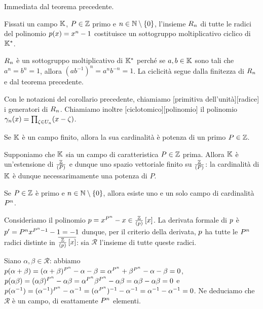 \Proof
Immediata dal teorema precedente.
\EndProof
\begin{Corollary}
	Fissati un campo $\mathbb{K}$, $P \in \mathbb{Z}$ primo e
	$n \in \mathbb{N} \setminus \lbrace 0 \rbrace$,
	l'insieme $\Roots_n$ di tutte le radici del polinomio
	$p(x) = x^n - 1$ costituisce un sottogruppo
	moltiplicativo ciclico di $\mathbb{K}^*$.
\end{Corollary}
\Proof
$\Roots_n$ \`e un sottogruppo moltiplicativo di $\mathbb{K}^*$
perch\'e se $a, b \in \mathbb{K}$ sono tali che $a^n = b^n = 1$, allora
$(ab^{-1})^n = a^nb^{-n} = 1$. La ciclicit\`a segue dalla finitezza di
$\Roots_n$ e dal teorema precedente.
\EndProof
\begin{Definition}\label{radici_primitive_def}
	Con le notazioni del corollario precedente,
	chiamiamo
	[primitiva dell'unit\`a][radice]
	i generatori di $\Roots_n$.
	Chiamiamo inoltre
	[ciclotomico][polinomio]
	il polinomio
	$\CyclotomicPolynomial{n}(x) =
	\prod_{\PrimitiveRoot \in \PrimitiveRoots[n]}
	(x - \PrimitiveRoot)$.
\end{Definition}
\begin{Theorem}
	Se $\mathbb{K}$ \`e un campo finito,
	allora la sua cardinalit\`a \`e potenza di un primo
	$P \in \mathbb{Z}$.
\end{Theorem}
\Proof
Supponiamo che $\mathbb{K}$ sia un campo di caratteristica
$P \in \mathbb{Z}$ prima.
Allora $\mathbb{K}$ \`e un'estensione di
$\frac{\mathbb{Z}}{\left ( P \right )}$ e dunque uno spazio vettoriale
finito su $\frac{\mathbb{Z}}{\left ( P \right )}$: la cardinalit\`a di
$\mathbb{K}$ \`e dunque necessarimamente una potenza di $P$.
\EndProof
\begin{Theorem}
	Se $P \in \mathbb{Z}$ \`e primo e $n \in \mathbb{N} \setminus \lbrace 0 \rbrace$, allora esiste uno e un solo campo di cardinalit\`a $P^n$.
\end{Theorem}
\Proof Consideriamo il polinomio $p = x^{P^n} - x \in \frac{\mathbb{Z}}{\left ( p \right )} \left [ x \right ]$. La derivata formale di $p$ \`e $p' = P^nx^{P^n - 1} - 1 = -1$ dunque, per il criterio della derivata, $p$ ha tutte le $P^n$ radici distinte in $\overline{\frac{\mathbb{Z}}{\left ( p \right )} \left [ x \right ]}$: sia $\mathcal{R}$ l'insieme di tutte queste radici.
\par Siano $\alpha, \beta \in \mathcal{R}$: abbiamo $p(\alpha + \beta) = (\alpha + \beta)^{P^n} - \alpha - \beta = \alpha^{P^n} + \beta^{P^n} - \alpha - \beta = 0$, $p(\alpha\beta) = (\alpha\beta)^{P^n} - \alpha\beta = \alpha^{P^n}\beta^{P^n} - \alpha\beta = \alpha\beta - \alpha\beta = 0$ e $p(\alpha^{-1}) = (\alpha^{-1})^{P^n} - \alpha^{-1} = (\alpha^{P^n})^{-1} - \alpha^{-1} = \alpha^{-1} - \alpha^{-1} = 0$. Ne deduciamo che $\mathcal{R}$ \`e un campo, di esattamente $P^n$ elementi.
